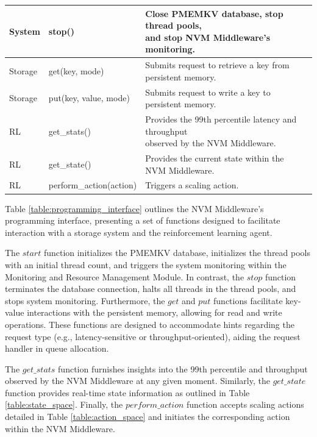 \begin{table}[ht]
\begin{adjustbox}{width=1\textwidth}
\begin{tabular}{|l|l|l|}
    \hline
    System & stop() & \makecell[cl]{Close PMEMKV database, stop thread pools, \\ and stop NVM Middleware's monitoring.} \\
    \hline
    Storage & get(key, mode) & \makecell[cl] {Submits request to retrieve a key from \\ persistent memory.} \\
    \hline
    Storage & put(key, value, mode) & \makecell[cl] {Submits request to write a key to \\ persistent memory.} \\
    \hline
    RL & get\_stats() & \makecell[cl] {Provides the 99th percentile latency and throughput \\ observed by the NVM Middleware.} \\
    \hline
    RL & get\_state() & \makecell[cl] {Provides the current state within the \\ NVM Middleware.} \\
    \hline
    RL & perform\_action(action) & Triggers a scaling action. \\
    \hline
  \end{tabular}
\end{adjustbox}
\end{table}


Table \ref{table:programming_interface} outlines the NVM Middleware's programming interface, presenting a set of functions designed to facilitate interaction with a storage system and the reinforcement learning agent. 

The $start$ function initializes the PMEMKV database, initializes the thread pools with an initial thread count, and triggers the system monitoring within the Monitoring and Resource Management Module. In contrast, the $stop$ function terminates the database connection, halts all threads in the thread pools, and stops system monitoring. Furthermore, the $get$ and $put$ functions facilitate key-value interactions with the persistent memory, allowing for read and write operations. These functions are designed to accommodate hints regarding the request type (e.g., latency-sensitive or throughput-oriented), aiding the request handler in queue allocation.

The $get\_stats$ function furnishes insights into the 99th percentile and throughput observed by the NVM Middleware at any given moment. Similarly, the $get\_state$ function provides real-time state information as outlined in Table \ref{table:state_space}. Finally, the $perform\_action$ function accepts scaling actions detailed in Table \ref{table:action_space} and initiates the corresponding action within the NVM Middleware.

